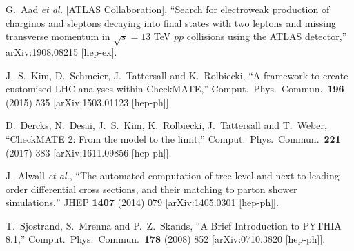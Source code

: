 \documentclass[10pt,fleqn]{article}
\begin{document}
\begin{thebibliography}{99}

  G.~Aad {\it et al.} [ATLAS Collaboration],
  ``Search for electroweak production of charginos and sleptons decaying into final states with two leptons and missing transverse momentum in $\sqrt{s}=13$ TeV $pp$ collisions using the ATLAS detector,''
  arXiv:1908.08215 [hep-ex].
  
  J.~S.~Kim, D.~Schmeier, J.~Tattersall and K.~Rolbiecki,
  ``A framework to create customised LHC analyses within CheckMATE,''
  Comput.\ Phys.\ Commun.\  {\bf 196} (2015) 535
  [arXiv:1503.01123 [hep-ph]].  
  
  D.~Dercks, N.~Desai, J.~S.~Kim, K.~Rolbiecki, J.~Tattersall and T.~Weber,
  ``CheckMATE 2: From the model to the limit,''
  Comput.\ Phys.\ Commun.\  {\bf 221} (2017) 383
  [arXiv:1611.09856 [hep-ph]].
 
 
  J.~Alwall {\it et al.},
  ``The automated computation of tree-level and next-to-leading order differential cross sections, and their matching to parton shower simulations,''
  JHEP {\bf 1407} (2014) 079
  [arXiv:1405.0301 [hep-ph]]. 
 
  T.~Sjostrand, S.~Mrenna and P.~Z.~Skands,
  ``A Brief Introduction to PYTHIA 8.1,''
  Comput.\ Phys.\ Commun.\  {\bf 178} (2008) 852
  [arXiv:0710.3820 [hep-ph]]. 

  
  
\end{thebibliography}
 
\end{document}
